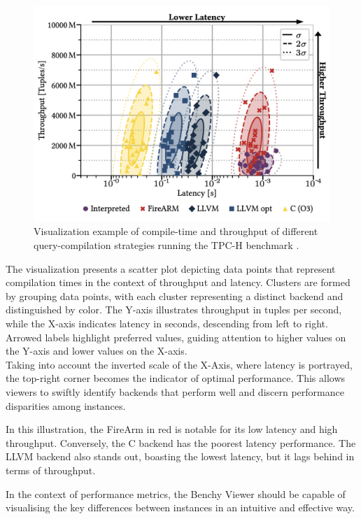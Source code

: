 \begin{figure}[h]
  \centering
  \includegraphics[width=0.8\linewidth]{figures/risc-metrcis-visualization.png}
  \caption{Visualization example of compile-time and throughput of different query-compilation strategies running the TPC-H benchmark \cite{Bringin-Compiling-Databases-to-RISC}.}
  \label{fig:risc-metrics}
\end{figure}

\noindent

The visualization presents a scatter plot depicting data points that represent  compilation times in the context of throughput and latency. Clusters are formed by grouping data points, with each cluster representing a distinct backend and distinguished by color. The Y-axis illustrates throughput in tuples per second, while the X-axis indicates latency in seconds, descending from left to right. Arrowed labels highlight preferred values, guiding attention to higher values on the Y-axis and lower values on the X-axis.\\
Taking into account the inverted scale of the X-Axis, where latency is portrayed, the top-right corner becomes the indicator of optimal performance. This allows viewers to swiftly identify backends that perform well and discern performance disparities among instances.

In this illustration, the FireArm in red is notable for its low latency and high throughput. Conversely, the C backend has the poorest latency performance. The LLVM backend also stands out, boasting the lowest latency, but it lags behind in terms of throughput.

In the context of performance metrics, the Benchy Viewer should be capable of visualising the key differences between instances in an intuitive and effective way. 


